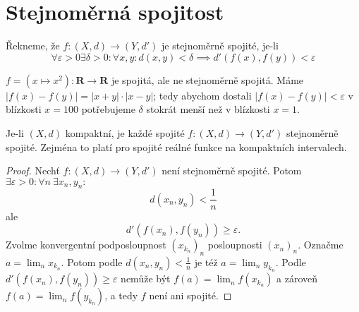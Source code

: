 \documentclass[../main.tex]{subfiles}
\begin{document}
\section{Stejnoměrná spojitost}
\begin{definition}
	Řekneme, že $f : (X,d) \rightarrow (Y,d')$ je stejnoměrně spojité, je-li
	\[\forall \varepsilon > 0 \exists \delta > 0 : \forall x,y : d(x,y) < \delta \implies d'(f(x),f(y)) < \varepsilon\]
	\noindent
\end{definition}

\begin{example}
	$f = (x \mapsto x^2) : \mathbf{R} \rightarrow \mathbf{R}$ je spojitá, ale ne stejnoměrně spojitá.
	Máme $|f(x) - f(y)| = |x+y| \cdot |x-y|$; tedy abychom dostali $|f(x)-f(y)| < \varepsilon $ v 
	blízkosti $x = 100$ potřebujeme $\delta$ stokrát menší než v blízkosti $x = 1$.
\end{example}

\begin{theorem}
	Je-li $(X,d)$ kompaktní, je každé spojité $f : (X,d) \rightarrow (Y,d')$ stejnoměrně spojité. Zejména to platí 
	pro spojité reálné funkce na kompaktních intervalech.
\end{theorem}

\begin{proof}
	Nechť $f : (X,d) \rightarrow (Y,d')$ není stejnoměrně spojité. Potom $\exists \varepsilon > 0 : \forall n\ \exists x_n, y_n :$
	\[d(x_n,y_n) < \frac{1}{n}\]
	ale
	\[d'(f(x_n),f(y_n)) \geq \varepsilon.\]
	Zvolme konvergentní podposloupnost $(x_{k_n})_n$ posloupnosti $(x_n)_n$. Označme $a = \lim_n x_{k_n}.$ Potom podle $d(x_n,y_n) < \frac{1}{n}$ je též 
	$a = \lim_n y_{k_n}.$ Podle $d'(f(x_n),f(y_n)) \geq \varepsilon$ nemůže být $f(a) = \lim_n f(x_{k_n})$ a zároveň $f(a) = \lim_n f(y_{k_n})$, 
	a tedy $f$ není ani spojité.
\end{proof}
\end{document}
